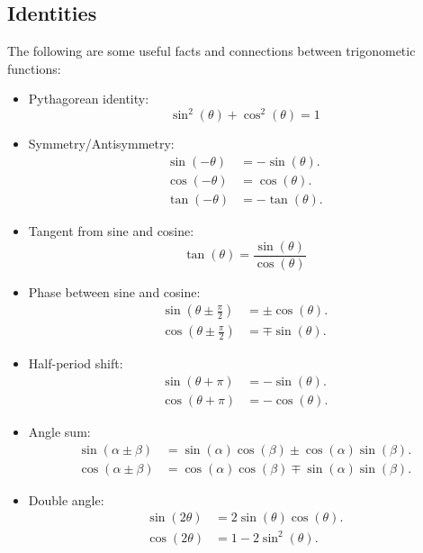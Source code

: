 \subsection{Identities}
The following are some useful facts and connections between trigonometic functions:
\begin{itemize}
	\item Pythagorean identity:
		\begin{equation}
			\sin^{2}(\theta) + \cos^{2}(\theta) = 1
		\end{equation}
	
	\item Symmetry/Antisymmetry:
		\begin{align}
			\sin(-\theta) &= -\sin(\theta).\\
			\cos(-\theta) &= \cos(\theta).\\
			\tan(-\theta) &= -\tan(\theta).
		\end{align}
	
	\item Tangent from sine and cosine:
		\begin{equation}
			\tan(\theta)=\frac{\sin(\theta)}{\cos(\theta)}
		\end{equation}
	
	\item Phase between sine and cosine:
		\begin{align}
			\sin\left(\theta\pm\frac{\pi}{2}\right) &= \pm\cos(\theta).\\
			\cos\left(\theta\pm\frac{\pi}{2}\right) &= \mp\sin(\theta).
		\end{align}
	
	\item Half-period shift:
		\begin{align}
			\sin(\theta+\pi) &= -\sin(\theta).\\
			\cos(\theta+\pi) &= -\cos(\theta).
		\end{align}
	
	\item Angle sum:
		\begin{align}
			\sin(\alpha\pm\beta) &= \sin(\alpha)\cos(\beta)\pm\cos(\alpha)\sin(\beta).\\
			\cos(\alpha\pm\beta) &= \cos(\alpha)\cos(\beta)\mp\sin(\alpha)\sin(\beta).
		\end{align}
	
	\item Double angle:
		\begin{align}
			\sin(2\theta) &= 2\sin(\theta)\cos(\theta).\\
			\cos(2\theta) &= 1-2\sin^{2}(\theta).
		\end{align}
	

\end{itemize}
